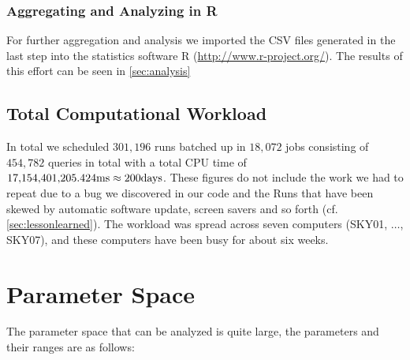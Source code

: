 \subsubsection{Aggregating and Analyzing in R}
\label{sec:aggregatingandanalyzing}
For further aggregation and analysis we imported the CSV files
generated in the last step into the statistics software R
(\url{http://www.r-project.org/}). The results of this effort can be
seen in \autoref{sec:analysis}


\subsection{Total Computational Workload}
\label{sec:totalworkload}
In total we scheduled $301{,}196$ runs batched up in $18{,}072$ jobs
consisting of $454{,}782$ queries in total with a total CPU time of
$17{,}154{,}401{,}205.424\textnormal{ms}
\approx 200\textnormal{days}$.  These figures do not include
the work we had to repeat due to a bug we discovered in our code and
the Runs that have been skewed by automatic software update, screen
savers and so forth (cf. \autoref{sec:lessonlearned}).  The
workload was spread across seven computers (SKY01, $\ldots$, SKY07),
and these computers have been busy for about six weeks.

\section{Parameter Space}
The parameter space that can be analyzed is quite large, the
parameters and their ranges are as follows:

